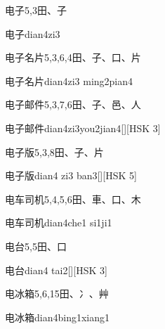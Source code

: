 \begin{entry}{电子}{5,3}{⽥、⼦}
  \begin{phonetics}{电子}{dian4zi3}
  \end{phonetics}
\end{entry}

\begin{entry}{电子名片}{5,3,6,4}{⽥、⼦、⼝、⽚}
  \begin{phonetics}{电子名片}{dian4zi3 ming2pian4}
  \end{phonetics}
\end{entry}

\begin{entry}{电子邮件}{5,3,7,6}{⽥、⼦、⾢、⼈}
  \begin{phonetics}{电子邮件}{dian4zi3you2jian4}[][HSK 3]
  \end{phonetics}
\end{entry}

\begin{entry}{电子版}{5,3,8}{⽥、⼦、⽚}
  \begin{phonetics}{电子版}{dian4 zi3 ban3}[][HSK 5]
  \end{phonetics}
\end{entry}

\begin{entry}{电车司机}{5,4,5,6}{⽥、⾞、⼝、⽊}
  \begin{phonetics}{电车司机}{dian4che1 si1ji1}
  \end{phonetics}
\end{entry}

\begin{entry}{电台}{5,5}{⽥、⼝}
  \begin{phonetics}{电台}{dian4 tai2}[][HSK 3]
  \end{phonetics}
\end{entry}

\begin{entry}{电冰箱}{5,6,15}{⽥、⼎、⾋}
  \begin{phonetics}{电冰箱}{dian4bing1xiang1}
  \end{phonetics}
\end{entry}

